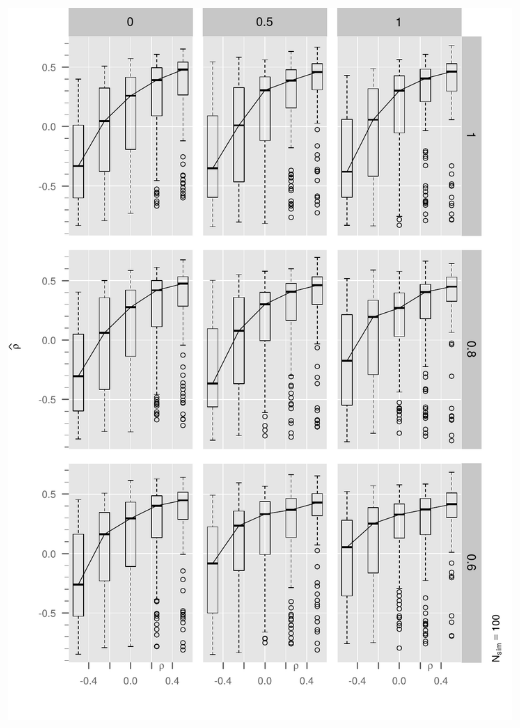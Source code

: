 \begin{frame}

\begin{center}
  \includegraphics[trim= 0cm 0cm 0cm 5.75cm, clip, width=1.00\textwidth]{Figure1/tbl1_n100_rho_mayplot.pdf}
\end{center}

\end{frame}

